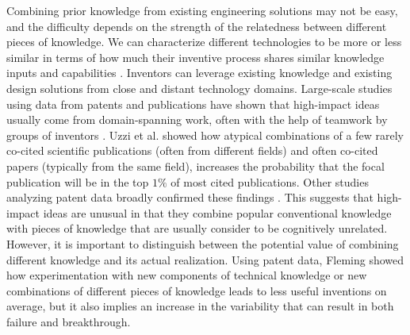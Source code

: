 \documentclass{dsj}
\begin{document}
Combining prior knowledge from existing engineering solutions may not be easy, and the difficulty depends on the strength of the relatedness between different pieces of knowledge. We can characterize different technologies to be more or less similar in terms of how much their inventive process shares similar knowledge inputs and capabilities \cite{Alstott2017}. Inventors can leverage existing knowledge and existing design solutions from close and distant technology domains. Large-scale studies using data from patents and publications have shown that high-impact ideas usually come from domain-spanning work, often with the help of teamwork by groups of inventors \cite{Uzzi2013, Wuchty2007}. Uzzi et al. \cite{Uzzi2013} showed how atypical combinations of a few rarely co-cited scientific publications (often from different fields) and often co-cited papers (typically from the same field), increases the probability that the focal publication will be in the top $1\%$ of most cited publications. Other studies analyzing patent data broadly confirmed these findings \cite{Kim2016, Malva2014, Phene2006}. This suggests that high-impact ideas are unusual in that they combine popular conventional knowledge with pieces of knowledge that are usually consider to be cognitively unrelated. However, it is important to distinguish between the potential value of combining different knowledge and its actual realization. Using patent data, Fleming \cite{Fleming2001} showed how experimentation with new components of technical knowledge or new combinations of different pieces of knowledge leads to less useful inventions on average, but it also implies an increase in the variability that can result in both failure and breakthrough. 
\end{document}
